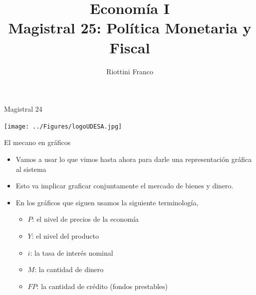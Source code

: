 \documentclass{beamer}
\title[Economía I]{Economía I \vspace{4mm}
\\ Magistral 25: Política Monetaria y Fiscal}
\date{}
\author[Franco Riottini]{Riottini Franco}
\institute[]{Universidad de San Andrés}
\begin{document}
\begin{frame}
\titlepage
\centering
Magistral 24

\texttt{[image: ../Figures/logoUDESA.jpg]} 
\end{frame}

\begin{frame}{El mecano en gráficos}

\begin{itemize}
    \item Vamos a usar lo que vimos hasta ahora para darle una representación gráfica al sistema 
    \item Esto va implicar graficar conjuntamente el mercado de bienes y dinero.
    \item En los gráficos que siguen usamos la siguiente terminología, 
    \begin{itemize}
        \item $P$: el nivel de precios de la economía
        \item $Y$: el nivel del producto
        \item $i$: la tasa de interés nominal
        \item $M$: la cantidad de dinero
        \item $FP$: la cantidad de crédito (fondos prestables)
    \end{itemize}
\end{itemize}
\end{frame}
\end{document}
